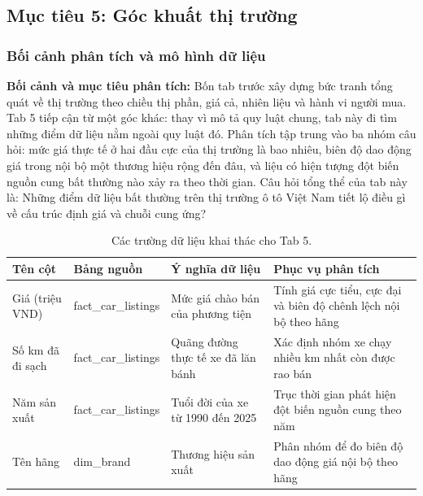 \subsection{Mục tiêu 5: Góc khuất thị trường}
\label{subsec:tab5}

\subsubsection{Bối cảnh phân tích và mô hình dữ liệu}
\label{subsubsec:tab5_schema}

\noindent\textbf{Bối cảnh và mục tiêu phân tích:}
Bốn tab trước xây dựng bức tranh tổng quát về thị trường theo chiều thị phần, giá cả, nhiên liệu và hành vi người mua. Tab 5 tiếp cận từ một góc khác: thay vì mô tả quy luật chung, tab này đi tìm những điểm dữ liệu nằm ngoài quy luật đó. Phân tích tập trung vào ba nhóm câu hỏi: mức giá thực tế ở hai đầu cực của thị trường là bao nhiêu, biên độ dao động giá trong nội bộ một thương hiệu rộng đến đâu, và liệu có hiện tượng đột biến nguồn cung bất thường nào xảy ra theo thời gian. Câu hỏi tổng thể của tab này là: Những điểm dữ liệu bất thường trên thị trường ô tô Việt Nam tiết lộ điều gì về cấu trúc định giá và chuỗi cung ứng?

\begin{table}[H]
\centering
\small
\begin{tabularx}{\textwidth}{L{3cm} L{3.5cm} L{4cm} Y}
\textbf{Tên cột} & \textbf{Bảng nguồn} & \textbf{Ý nghĩa dữ liệu} & \textbf{Phục vụ phân tích} \\ \hline
Giá (triệu VND) & fact\_car\_listings & Mức giá chào bán của phương tiện & Tính giá cực tiểu, cực đại và biên độ chênh lệch nội bộ theo hãng \\
Số km đã đi sạch & fact\_car\_listings & Quãng đường thực tế xe đã lăn bánh & Xác định nhóm xe chạy nhiều km nhất còn được rao bán \\
Năm sản xuất & fact\_car\_listings & Tuổi đời của xe từ 1990 đến 2025 & Trục thời gian phát hiện đột biến nguồn cung theo năm \\
Tên hãng & dim\_brand & Thương hiệu sản xuất & Phân nhóm để đo biên độ dao động giá nội bộ theo hãng \\
\end{tabularx}
\caption{Các trường dữ liệu khai thác cho Tab 5.}
\label{tab:schema_tab5}
\end{table}

